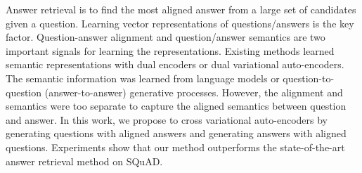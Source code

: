 Answer retrieval is to find the most aligned answer from a large set of candidates given a question. Learning vector representations of questions/answers is the key factor. Question-answer alignment and question/answer semantics are two important signals for learning the representations. Existing methods learned semantic representations with dual encoders or dual variational auto-encoders. The semantic information was learned from language models or question-to-question (answer-to-answer) generative processes. However, the alignment and semantics were too separate to capture the aligned semantics between question and answer. In this work, we propose to cross variational auto-encoders by generating questions with aligned answers and generating answers with aligned questions. Experiments show that our method outperforms the state-of-the-art answer retrieval method on SQuAD.
